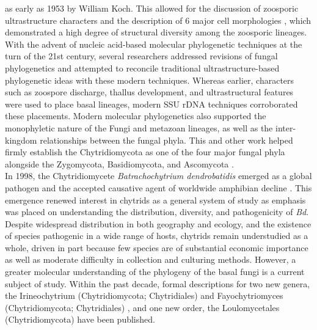 as early as 1953 by William Koch. This allowed for the discussion
of zoosporic ultrastructure characters \cite{Koch1958motileI,Koch1958motileII}
and the description of 6 major cell morphologies \cite{Koch1961motileIII},
which demonstrated a high degree of structural diversity among the zoosporic lineages. \\
\indent With the advent of nucleic acid-based molecular phylogenetic techniques
at the turn of the 21st century, several researchers addressed revisions of
fungal phylogenetics and attempted to reconcile traditional ultrastructure-based
phylogenetic ideas with these modern techniques. Whereas earlier, characters such
as zoospore discharge, thallus development, and ultrastructural features were used
to place basal lineages, modern SSU rDNA techniques corroborated these placements.
Modern molecular phylogenetics also supported the monophyletic nature of the Fungi and metazoan
lineages, as well as the inter-kingdom relationships between the fungal phyla. This
and other work helped firmly establish the Chytridiomycota as one of the four major
fungal phyla alongside the Zygomycota, Basidiomycota, and Ascomycota
\cite{Bruns1991,Bruns1992,Wainright1993,James2006sixGene,James2006Blasto,Hibbett2007}.\\
\indent In 1998, the Chytridiomycete
\textit{Batrachochytrium dendrobatidis} emerged as a global pathogen
and the accepted causative agent of worldwide amphibian decline
\cite{Berger1998}. This emergence renewed interest in chytrids 
as a general system of study as emphasis was placed on understanding the distribution, 
diversity, and pathogenicity of \textit{Bd}.\\
\indent Despite widespread distribution in both geography and ecology,
and the existence of species pathogenic in a wide range of hosts,
chytrids remain understudied as a whole, driven in part because few
species are of substantial economic importance
\cite{Powell1993,James2000} as well as moderate difficulty in
collection and culturing methods. However, a greater molecular 
understanding of the phylogeny of the basal fungi is a current subject of study. 
Within the past decade, formal descriptions for two new genera, 
the Irineochytrium (Chytridiomycota; Chytridiales) \cite{Letcher2014} 
and Fayochytriomyces (Chytridiomycota; Chytridiales) \cite{Davis2015}, 
and one new order, the Loulomycetales (Chytridiomycota) \cite{Simmons2009} 
have been published.\\

